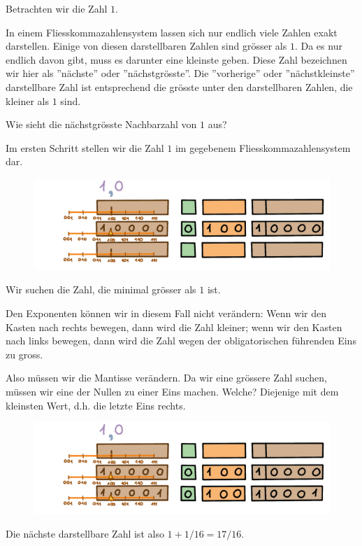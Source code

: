 \begin{beispiel}
Betrachten wir die Zahl \(1\).

In einem Fliesskommazahlensystem lassen sich nur endlich viele Zahlen exakt darstellen. Einige von diesen darstellbaren Zahlen sind grösser als \(1\). Da es nur endlich davon gibt, muss es darunter eine kleinste geben. Diese Zahl bezeichnen wir hier als ''nächste'' oder ''nächstgrösste''. Die ''vorherige'' oder ''nächstkleinste'' darstellbare Zahl ist entsprechend die grösste unter den darstellbaren Zahlen, die kleiner als \(1\) sind.

Wie sieht die nächstgrösste Nachbarzahl von \(1\) aus?

Im ersten Schritt stellen wir die Zahl \(1\) im gegebenem Fliesskommazahlensystem dar.
\begin{figure}[H]
\centering
\includegraphics[width=\linewidth]{Pictures/Nachbarn1_1.png} 
\end{figure}

Wir suchen die Zahl, die minimal grösser als \(1\) ist.

Den Exponenten können wir in diesem Fall nicht verändern: Wenn wir den Kasten nach rechts bewegen, dann wird die Zahl kleiner; wenn wir den Kasten nach links bewegen, dann wird die Zahl wegen der obligatorischen führenden Eins zu gross.

Also müssen wir die Mantisse verändern. Da wir eine grössere Zahl suchen, müssen wir eine der Nullen zu einer Eins machen. Welche? Diejenige mit dem kleinsten Wert, d.h. die letzte Eins rechts.

\begin{figure}[H]
\centering
\includegraphics[width=\linewidth]{Pictures/Nachbarn1_N.png} 
\end{figure}
Die nächste darstellbare Zahl ist also \(1 + 1/16 = 17/16\).
\end{beispiel}

